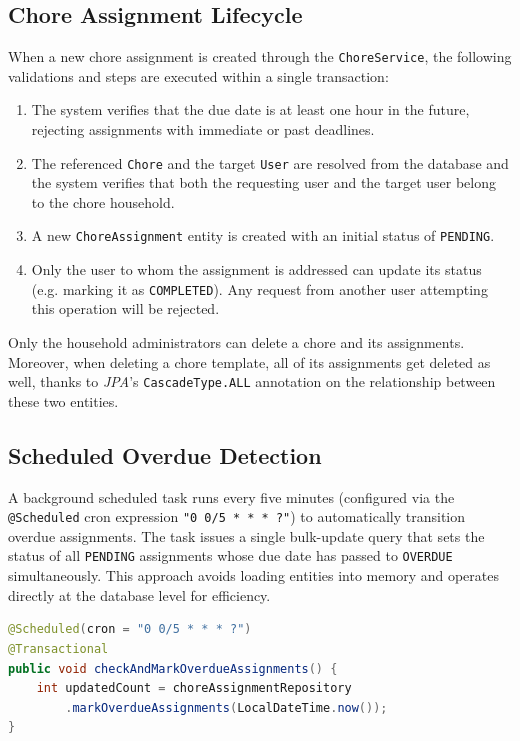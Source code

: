 \subsection{Chore Assignment Lifecycle}
When a new chore assignment is created through the \texttt{ChoreService}, the following validations and steps are executed within a single transaction:
\begin{enumerate}
    \item The system verifies that the due date is at least one hour in the future, rejecting assignments with immediate or past deadlines.
    \item The referenced \texttt{Chore} and the target \texttt{User} are resolved from the database and the system verifies that both the requesting user and the target user belong to the chore household.
    \item A new \texttt{ChoreAssignment} entity is created with an initial status of \texttt{PENDING}.
    \item Only the user to whom the assignment is addressed can update its status (e.g. marking it as \texttt{COMPLETED}). Any request from another user attempting this operation will be rejected.
\end{enumerate}
Only the household administrators can delete a chore and its assignments. Moreover, when deleting a chore template, all of its assignments get deleted as well, thanks to \textit{JPA}'s \texttt{CascadeType.ALL} annotation on the relationship between these two entities.

\subsection{Scheduled Overdue Detection}
\label{sec:chore-scheduler}
A background scheduled task runs every five minutes (configured via the \texttt{@Scheduled} cron expression \texttt{"0 0/5 * * * ?"}) to automatically transition overdue assignments. The task issues a single bulk-update query that sets the status of all \texttt{PENDING} assignments whose due date has passed to \texttt{OVERDUE} simultaneously. This approach avoids loading entities into memory and operates directly at the database level for efficiency.

\begin{lstlisting}[language=Java, caption=Scheduled Overdue Detection]
@Scheduled(cron = "0 0/5 * * * ?")
@Transactional
public void checkAndMarkOverdueAssignments() {
    int updatedCount = choreAssignmentRepository
        .markOverdueAssignments(LocalDateTime.now());
}
\end{lstlisting}

